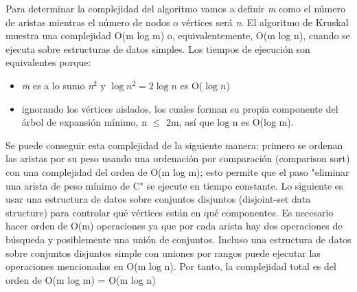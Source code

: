 Para determinar la complejidad del algoritmo vamos a definir {\em m} como el número de aristas mientras el número de nodos o vértices será {\em n}. El algoritmo de Kruskal muestra una complejidad O(m log m) o, equivalentemente, O(m log n), cuando se ejecuta sobre estructuras de datos simples. Los tiempos de ejecución son equivalentes porque: 

\begin{itemize}
	\item {\em m} es a lo sumo {\em n$^{2}$} y $\log n^{2}=2\log n$ es O($\log n$) 
	\item ignorando los vértices aislados, los cuales forman su propia componente del árbol de expansión mínimo, n $\leq$  2m, así que log n es O(log m).
\end{itemize}

Se puede conseguir esta complejidad de la siguiente manera: primero se ordenan las aristas por su peso usando una ordenación por comparación (comparison sort) con una complejidad del orden de O(m log m); esto permite que el paso "eliminar una arista de peso mínimo de C" se ejecute en tiempo constante. Lo siguiente es usar una estructura de datos sobre conjuntos disjuntos (disjoint-set data structure) para controlar qué vértices están en qué componentes. Es necesario hacer orden de O(m) operaciones ya que por cada arista hay dos operaciones de búsqueda y posiblemente una unión de conjuntos. Incluso una estructura de datos sobre conjuntos disjuntos simple con uniones por rangos puede ejecutar las operaciones mencionadas en O(m log n). Por tanto, la complejidad total es del orden de O(m log m) = O(m log n)